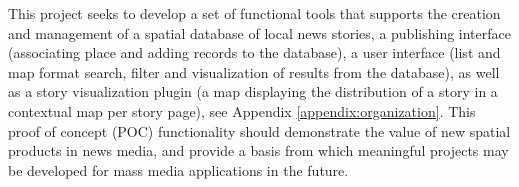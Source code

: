 This project seeks to develop a set of functional tools that supports the creation and management of a spatial database of local news stories, a publishing interface (associating place and adding records to the database), a user interface (list and map format search, filter and visualization of results from the database), as well as a story visualization plugin (a map displaying the distribution of a story in a contextual map per story page), see Appendix \ref{appendix:organization}. This proof of concept (POC) functionality should demonstrate the value of new spatial products in news media, and provide a basis from which meaningful projects may be developed for mass media applications in the future.

